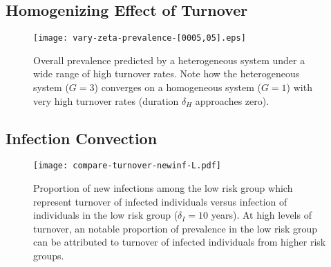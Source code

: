 \subsection{Homogenizing Effect of Turnover}\label{aa:homogenize}
\begin{figure}[H]
  \centering
  \texttt{[image: vary-zeta-prevalence-[0005,05].eps]}
  \caption{Overall prevalence predicted by a heterogeneous system
    under a wide range of high turnover rates.
    Note how the heterogeneous system ($G = 3$) converges on a homogeneous system ($G = 1$)
    with very high turnover rates (duration $\delta_H$ approaches zero).}
  \label{fig:prev-converge}
\end{figure}
\subsection{Infection Convection}\label{aa:new-inf}
\begin{figure}[H]
  \centering
  \texttt{[image: compare-turnover-newinf-L.pdf]}
  \caption{Proportion of new infections among the low risk group
    which represent turnover of infected individuals
    versus infection of individuals in the low risk group ($\delta_I = 10$ years).
    At high levels of turnover, an notable proportion of prevalence
    in the low risk group can be attributed to turnover of infected individuals
    from higher risk groups.}
  \label{fig:new-inf-L}
\end{figure}
